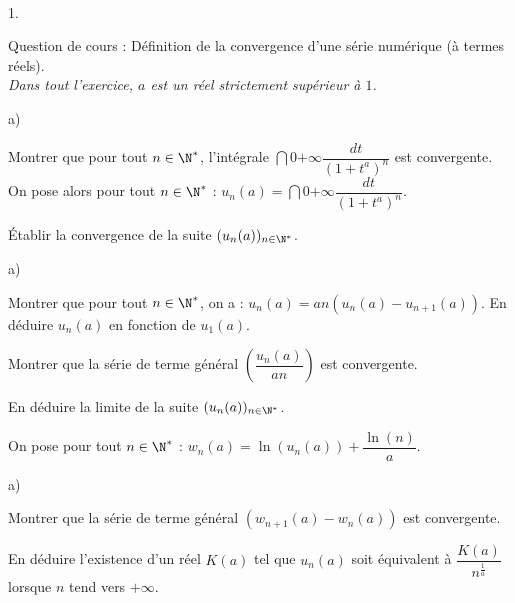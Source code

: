 \documentclass[11pt]{article}%
\begin{document}
\begin{exerciceAP}~
  \begin{noliste}{1.}
    \setlength{\itemsep}{2mm}
  \item Question de cours : Définition de la convergence d'une série
    numérique (à termes réels).\\
    {\it Dans tout l'exercice, $a$ est un réel strictement supérieur à
      $1$.}
  \item
    \begin{noliste}{a)}
    \setlength{\itemsep}{2mm}
    \item Montrer que pour tout $n\in\N^*$, l'intégrale
      $\dint{0}{+\infty} \dfrac{dt}{(1+t^a)^n}$ est convergente. On
      pose alors pour tout $n\in\N^*$ : $u_n(a)=\dint{0}{+\infty}
      \dfrac{dt}{(1+t^a)^n}$.
    \item Établir la convergence de la suite $(u_n(a))_{n\in\N^*}$.
    \end{noliste}

  \item
    \begin{noliste}{a)}
    \setlength{\itemsep}{2mm}
    \item Montrer que pour tout $n\in\N^*$, on a :
      $u_n(a)=an(u_n(a)-u_{n+1}(a))$. En déduire $u_n(a)$ en fonction
      de $u_1(a)$.
    \item Montrer que la série de terme général
      $\left(\dfrac{u_n(a)}{an}\right)$ est convergente.
    \item En déduire la limite de la suite $(u_n(a))_{n\in\N^*}$.
    \end{noliste}

  \item On pose pour tout $n\in\N^*$ :
    $w_n(a)=\ln(u_n(a))+\dfrac{\ln(n)}{a}$.
    \begin{noliste}{a)}
    \setlength{\itemsep}{2mm}
    \item Montrer que la série de terme général $(w_{n+1}(a)-w_n(a))$
      est convergente.
    \item En déduire l'existence d'un réel $K(a)$ tel que $u_n(a)$
      soit équivalent à $\dfrac{K(a)}{n^{\frac{1}{a}}}$ lorsque $n$
      tend vers $+\infty$.
    \end{noliste}
  \end{noliste}
\end{exerciceAP}

\end{document}
